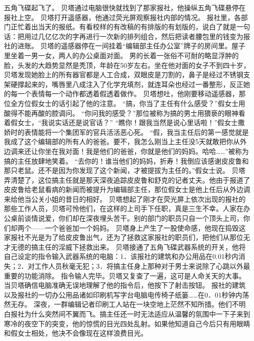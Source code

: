\documentclass[a4paper,12pt,UTF8,twoside]{ctexbook}
\begin{document}
        五角飞碟起飞了。 
        贝塔通过电脑很快就找到了那家报社，他操纵五角飞碟悬停在报社上空。 
        贝塔打开遥感器，他通过荧光屏观察报社内部的情况。 
        报社里，各部门正忙着出当天的报纸。有看校样的有改稿的有排版的有划版的，说白了就是一句话：把用过几亿亿次的字再进行一次新的排列组合，然后把读者腰包里的钱变为报社的进账。 
        贝塔的遥感器停在一间挂着“编辑部主任办公室”牌子的房间里。屋子里坐着一男一女，两人的办公桌面对面。 
        男的长着一张俗不可耐的略显浮肿的脸，头发的大趋势显然是秃顶，年龄在50岁左右。坐在他对面的女子不到四十岁，贝塔发现她脸上的所有器官都是人工合成，双眼皮是刀割的，鼻子是经过不锈钢支架硬撑起来的，嘴唇里八成注入了化学充填剂，就连耳朵也经过一番整形，反正她的每一个表情每一个动作都透着假透着做作。 
        贝塔想吐，他刚要移动遥感器，那位全方位假女士的话引起了他的注意。 
        “搞，你当了主任有什么感受？”假女士用酸得不能再酸的腔调问。 
        “你问我的感受？”那位被称为搞的男士用猥亵的眼神看着假女士，“我说实话还是说官话？” 
        “瞧你！跟我当然是说心里话啦！”假女士撒娇时的表情能将一个集团军的官兵活活恶心死。 
        “假，我当主任后的第一感觉就是我成了这个编辑部的所有人的爸爸。要不，我怎么刚当上主任没5天就敢把你从外边调来还让你坐在我对面！我是他们的爸爸，你就是他们的妈妈。哈哈……”被称为搞的主任放肆地笑着。 
        “去你的！谁当他们的妈妈，折寿！我倒应该感谢皮皮鲁和那只老鼠。还不是因为你发现了这个新闻，才被提拔为主任的。”假女士说。 
        贝塔弄清楚了，这位搞主任就是那天深夜追踪皮皮鲁和舒克的记者丈夫。他由于报道了皮皮鲁给老鼠看病的新闻而被提升为编辑部主任，那位假女士是他上任后从外边调来给他当公关小姐的昔日的相好。 
        贝塔想起了刚才在荧光屏上依次出现的报社的那些工作人员，贝塔可怜他们，在这样的上司手下任职，真是三生不幸。人家在办公桌前谈情说爱，你们却在深夜埋头苦干。别的部门的职员只自一个顶头上司，你们却两个——一个爸爸加一个妈妈。 
        贝塔身上产生了一股使命感，他现在捣毁这家报社不光是为了给皮皮鲁出气，还为了拯救这家报社的职员们，把他们从那位无才无德的搞主任的淫威下拯救出来。 
        贝塔接通了五角飞碟武器系统的开关，他将自己设定的指令输入武器系统的电脑：1．该报社的建筑和办公用品在0.01秒内消失；2．对工作人员秋毫无犯；3．将搞主任身上那种对于男士来说除了心跳以外最重要的功能消除。 
        指令输人完毕。贝塔又复查了一遍，这可是人命关天的大事。当贝塔确信电脑准确无误地理解了他的指令后，他按下了射击按钮。 
        报社的建筑以及报社的一切办公用品诸如印刷机写字台电脑电传椅子纸篓……在0．01秒钟内荡然无存。 
        深夜，一群编辑记者印刷工人站在一块空地上茫然不知所措。他们不明白报社为什么突然间不翼而飞。搞主任还一时无法适应从温馨的氛围中一下子来到寒冷的夜空下的突变，他的惊慌的目光四处乱射。如果他知道自己今后只有用眼睛和假女士相处，他决不会像现在这样浪费目光。 
\end{document}
